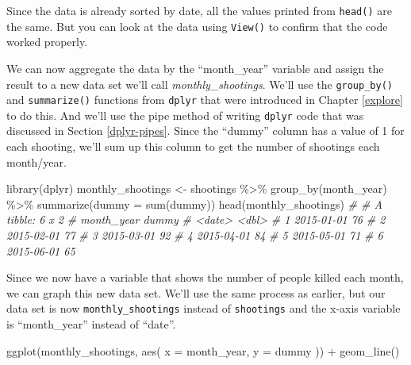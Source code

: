 \documentclass[
  a4paper,
]{krantz}
\makeatletter
\newenvironment{Shaded}{\begin{snugshade}}{\end{snugshade}}
\newcommand{\AttributeTok}[1]{\textcolor[rgb]{0.61,0.61,0.61}{#1}}
\newcommand{\CommentTok}[1]{\textcolor[rgb]{0.37,0.37,0.37}{\textit{#1}}}
\newcommand{\FunctionTok}[1]{\textcolor[rgb]{0,0,0}{#1}}
\newcommand{\NormalTok}[1]{#1}
\newcommand{\OtherTok}[1]{\textcolor[rgb]{0.37,0.37,0.37}{#1}}
\newcommand{\SpecialCharTok}[1]{\textcolor[rgb]{0,0,0}{#1}}
\newenvironment{kframe}{%
\medskip{}
\setlength{\fboxsep}{.8em}
 \def\at@end@of@kframe{}%
 \ifinner\ifhmode%
  \def\at@end@of@kframe{\end{minipage}}%
  \begin{minipage}{\columnwidth}%
 \fi\fi%
 \def\FrameCommand##1{\hskip\@totalleftmargin \hskip-\fboxsep
 \colorbox{shadecolor}{##1}\hskip-\fboxsep
     \hskip-\linewidth \hskip-\@totalleftmargin \hskip\columnwidth}%
 \MakeFramed {\advance\hsize-\width
   \@totalleftmargin\z@ \linewidth\hsize
   \@setminipage}}%
 {\par\unskip\endMakeFramed%
 \at@end@of@kframe}
\renewenvironment{Shaded}{\begin{kframe}}{\end{kframe}}
\makeatother
\begin{document}
Since the data is already sorted by date, all the values
printed from \texttt{head()} are the same. But you can look
at the data using \texttt{View()} to confirm that the code
worked properly.

We can now aggregate the data by the ``month\_year''
variable and assign the result to a new data set we'll call
\emph{monthly\_shootings}. We'll use the
\texttt{group\_by()} and \texttt{summarize()} functions from
\texttt{dplyr} that were introduced in Chapter \ref{explore}
to do this. And we'll use the pipe method of writing
\texttt{dplyr} code that was discussed in Section
\ref{dplyr-pipes}. Since the ``dummy'' column has a value of
1 for each shooting, we'll sum up this column to get the
number of shootings each month/year.

\begin{Shaded}
\begin{Highlighting}[]
\FunctionTok{library}\NormalTok{(dplyr)}
\NormalTok{monthly\_shootings }\OtherTok{\textless{}{-}}\NormalTok{ shootings }\SpecialCharTok{\%\textgreater{}\%}
  \FunctionTok{group\_by}\NormalTok{(month\_year) }\SpecialCharTok{\%\textgreater{}\%}
  \FunctionTok{summarize}\NormalTok{(}\AttributeTok{dummy =} \FunctionTok{sum}\NormalTok{(dummy))}
\FunctionTok{head}\NormalTok{(monthly\_shootings)}
\CommentTok{\# \# A tibble: 6 x 2}
\CommentTok{\#   month\_year dummy}
\CommentTok{\#   \textless{}date\textgreater{}     \textless{}dbl\textgreater{}}
\CommentTok{\# 1 2015{-}01{-}01    76}
\CommentTok{\# 2 2015{-}02{-}01    77}
\CommentTok{\# 3 2015{-}03{-}01    92}
\CommentTok{\# 4 2015{-}04{-}01    84}
\CommentTok{\# 5 2015{-}05{-}01    71}
\CommentTok{\# 6 2015{-}06{-}01    65}
\end{Highlighting}
\end{Shaded}

Since we now have a variable that shows the number of people
killed each month, we can graph this new data set. We'll use
the same process as earlier, but our data set is now
\texttt{monthly\_shootings} instead of \texttt{shootings}
and the x-axis variable is ``month\_year'' instead of
``date''.

\begin{Shaded}
\begin{Highlighting}[]
\FunctionTok{ggplot}\NormalTok{(monthly\_shootings, }\FunctionTok{aes}\NormalTok{(}
  \AttributeTok{x =}\NormalTok{ month\_year,}
  \AttributeTok{y =}\NormalTok{ dummy}
\NormalTok{)) }\SpecialCharTok{+}
  \FunctionTok{geom\_line}\NormalTok{()}
\end{Highlighting}
\end{Shaded}
\end{document}
